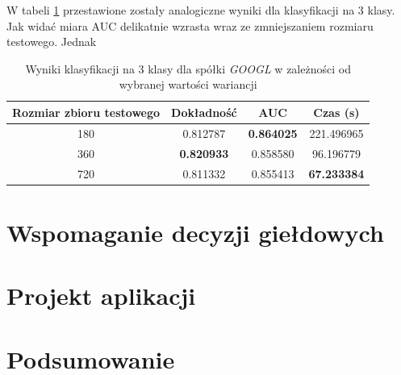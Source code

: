 \documentclass[a4paper, twoside, 11pt, openright]{article}
\begin{document}
W tabeli \ref{tab:nn_walk_forward_test_discrete} przestawione zostały analogiczne wyniki dla klasyfikacji na 3 klasy. Jak widać miara AUC delikatnie wzrasta wraz ze zmniejszaniem rozmiaru testowego. Jednak 

\begin{table}[H]
    \centering
    \begin{tabular}{|c|c|c|c|}
    \hline
        \textbf{Rozmiar zbioru testowego} & \textbf{Dokładność} &  \textbf{AUC} &  \textbf{Czas (s)} \\ \hline
180                         &  0.812787 &  \textbf{0.864025} &  221.496965   \\ \hline
360                         &  \textbf{0.820933} &  0.858580 &   96.196779  \\ \hline
720                         &  0.811332 &  0.855413 &   \textbf{67.233384}    \\ \hline
    \end{tabular}
    \caption{Wyniki klasyfikacji na 3 klasy dla spółki \textit{GOOGL} w zależności od wybranej wartości wariancji}
    \label{tab:nn_walk_forward_test_discrete}
\end{table}

\newpage

\section{Wspomaganie decyzji giełdowych}

\section{Projekt aplikacji}

\section{Podsumowanie}


\newpage
\end{document}
